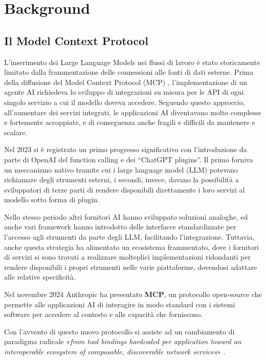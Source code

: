 \chapter{Background}
\label{chap:1}

\section{Il Model Context Protocol}\label{introduzione-su-mcp}

L'inserimento dei Large Language Models nei flussi di lavoro è stato
storicamente limitato dalla frammentazione delle connessioni alle fonti
di dati esterne. Prima della diffusione del Model Context Protocol (MCP) 
\autocite{hasan2026modelcontextprotocolmcp}, l'implementazione di un agente 
AI richiedeva lo sviluppo di integrazioni su misura per le API di ogni 
singolo servizio a cui il modello doveva accedere. Seguendo questo approccio, 
all'aumentare dei servizi integrati, le applicazioni AI diventavano molto 
complesse e fortemente accoppiate, e di conseguenza anche fragili e difficili 
da mantenere e scalare.

Nel 2023 si è registrato un primo progresso significativo con
l'introduzione da parte di OpenAI del function calling e dei ``ChatGPT
plugins''. Il primo forniva un meccanismo nativo tramite cui i large
language model (LLM) potevano richiamare degli strumenti esterni, i
secondi, invece, davano la possibilità a sviluppatori di terze parti di
rendere disponibili direttamente i loro servizi al modello sotto forma
di plugin.

Nello stesso periodo altri fornitori AI hanno sviluppato soluzioni
analoghe, ed anche vari framework hanno introdotto delle interfacce
standardizzate per l'accesso agli strumenti da parte degli LLM,
facilitando l'integrazione. Tuttavia, anche questa strategia ha
alimentato un ecosistema frammentato, dove i fornitori di servizi si
sono trovati a realizzare molteplici implementazioni ridondanti per
rendere disponibili i propri strumenti nelle varie piattaforme,
dovendosi adattare alle relative specificità.

Nel novembre 2024 Anthropic ha presentato \textbf{MCP}, un protocollo 
open-source che permette alle applicazioni AI di interagire in modo 
standard con i sistemi software per accedere al contesto e alle capacità 
che forniscono.

Con l'avvento di questo nuovo protocollo si assiste ad un cambiamento di
paradigma radicale «\emph{from tool bindings hardcoded per application
toward an interoperable ecosystem of composable, discoverable network
services}» \autocite{hou2025modelcontextprotocolmcp}.

